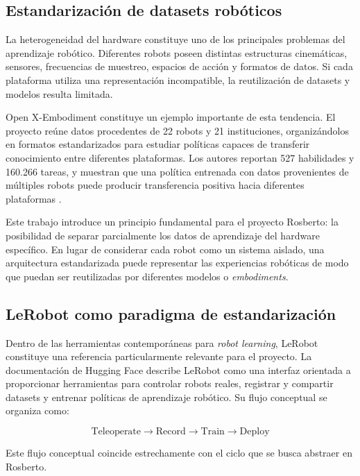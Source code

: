 \documentclass[stu,12pt,floatsintext]{apa7}
\begin{document}
\subsection{Estandarización de datasets robóticos}

La heterogeneidad del hardware constituye uno de los principales problemas del aprendizaje robótico. Diferentes robots poseen distintas estructuras cinemáticas, sensores, frecuencias de muestreo, espacios de acción y formatos de datos. Si cada plataforma utiliza una representación incompatible, la reutilización de datasets y modelos resulta limitada.

Open X-Embodiment constituye un ejemplo importante de esta tendencia. El proyecto reúne datos procedentes de 22 robots y 21 instituciones, organizándolos en formatos estandarizados para estudiar políticas capaces de transferir conocimiento entre diferentes plataformas. Los autores reportan 527 habilidades y 160.266 tareas, y muestran que una política entrenada con datos provenientes de múltiples robots puede producir transferencia positiva hacia diferentes plataformas \parencite{fang2023rh20tcomprehensiveroboticdataset}.

Este trabajo introduce un principio fundamental para el proyecto Rosberto: la posibilidad de separar parcialmente los datos de aprendizaje del hardware específico. En lugar de considerar cada robot como un sistema aislado, una arquitectura estandarizada puede representar las experiencias robóticas de modo que puedan ser reutilizadas por diferentes modelos o \textit{embodiments}.

\subsection{LeRobot como paradigma de estandarización}

Dentro de las herramientas contemporáneas para \textit{robot learning}, LeRobot constituye una referencia particularmente relevante para el proyecto. La documentación de Hugging Face describe LeRobot como una interfaz orientada a proporcionar herramientas para controlar robots reales, registrar y compartir datasets y entrenar políticas de aprendizaje robótico. Su flujo conceptual se organiza como:

\begin{equation}
\text{Teleoperate}
\rightarrow
\text{Record}
\rightarrow
\text{Train}
\rightarrow
\text{Deploy}
\end{equation}

Este flujo conceptual coincide estrechamente con el ciclo que se busca abstraer en Rosberto.
\end{document}

